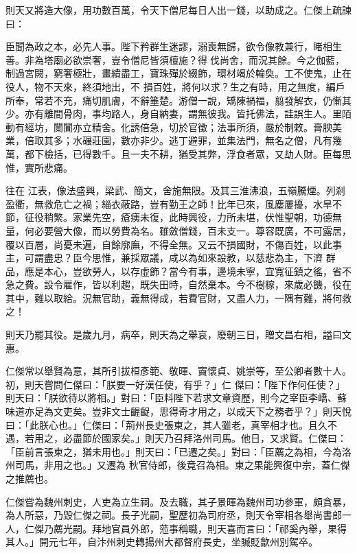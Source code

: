 \begin{pinyinscope}
 則天又將造大像，用功數百萬，令天下僧尼每日人出一錢，以助成之。仁傑上疏諫曰：



 臣聞為政之本，必先人事。陛下矜群生迷謬，溺喪無歸，欲令像教兼行，睹相生善。非為塔廟必欲崇奢，豈令僧尼皆須檀施？得伐尚舍，而況其餘。今之伽藍，制過宮闕，窮奢極壯，畫繢盡工，寶珠殫於綴飾，環材竭於輪奐。工不使鬼，止在役人，物不天來，終須地出，不
 損百姓，將何以求？生之有時，用之無度，編戶所奉，常若不充，痛切肌膚，不辭箠楚。游僧一說，矯陳禍福，翦發解衣，仍慚其少。亦有離間骨肉，事均路人，身自納妻，謂無彼我。皆托佛法，詿誤生人。里陌動有經坊，闤闠亦立精舍。化誘倍急，切於官徵；法事所須，嚴於制敕。膏腴美業，倍取其多；水碾莊園，數亦非少。逃丁避罪，並集法門，無名之僧，凡有幾萬，都下檢括，已得數千。且一夫不耕，猶受其弊，浮食者眾，又劫人財。臣每思惟，實所悲痛。



 往在
 江表，像法盛興，梁武、簡文，舍施無限。及其三淮沸浪，五嶺騰煙。列剎盈衢，無救危亡之禍；緇衣蔽路，豈有勤王之師！比年已來，風塵屢擾，水旱不節，征役稍繁。家業先空，瘡痍未復，此時興役，力所未堪，伏惟聖朝，功德無量，何必要營大像，而以勞費為名。雖斂僧錢，百未支一。尊容既廣，不可露居，覆以百層，尚憂未遍，自餘廓廡，不得全無。又云不損國財，不傷百姓，以此事主，可謂盡忠？臣今思惟，兼採眾議，咸以為如來設教，以慈悲為主，下濟
 群品，應是本心，豈欲勞人，以存虛飾？當今有事，邊境未寧，宜寬征鎮之徭，省不急之費。設令雇作，皆以利趨，既失田時，自然棄本。今不樹稼，來歲必饑，役在其中，難以取給。況無官助，義無得成，若費官財，又盡人力，一隅有難，將何救之！



 則天乃罷其役。是歲九月，病卒，則天為之舉哀，廢朝三日，贈文昌右相，謚曰文惠。



 仁傑常以舉賢為意，其所引拔桓彥範、敬暉、竇懷貞、姚崇等，至公卿者數十人。初，則天嘗問仁傑曰：「朕要一好漢任使，有乎？」仁
 傑曰：「陛下作何任使？」則天曰：「朕欲待以將相。」對曰：「臣料陛下若求文章資歷，則今之宰臣李嶠、蘇味道亦足為文吏矣。豈非文士齷齪，思得奇才用之，以成天下之務者乎？」則天悅曰：「此朕心也。」仁傑曰：「荊州長史張柬之，其人雖老，真宰相才也。且久不遇，若用之，必盡節於國家矣。」則天乃召拜洛州司馬。他日，又求賢。仁傑曰：「臣前言張柬之，猶未用也。」則天曰：「已遷之矣。」對曰：「臣薦之為相，今為洛州司馬，非用之也。」又遷為
 秋官侍郎，後竟召為相。柬之果能興復中宗，蓋仁傑之推薦也。



 仁傑嘗為魏州刺史，人吏為立生祠。及去職，其子景暉為魏州司功參軍，頗貪暴，為人所惡，乃毀仁傑之祠。長子光嗣，聖歷初為司府丞，則天令宰相各舉尚書郎一人，仁傑乃薦光嗣。拜地官員外郎，蒞事稱職，則天喜而言曰：「祁奚內舉，果得其人。」開元七年，自汴州刺史轉揚州大都督府長史，坐贓貶歙州別駕卒。




\end{pinyinscope}
